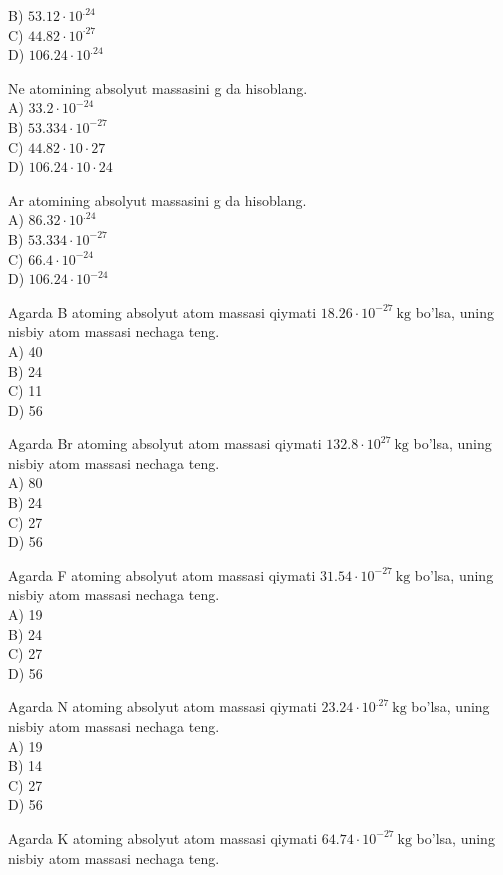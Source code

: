 B) $53.12 \cdot 10^{.24}$\\
C) $44.82 \cdot 10^{\cdot 27}$\\
D) $106.24 \cdot 10^{.24}$
  \item Ne atomining absolyut massasini g da hisoblang.\\
A) $33.2 \cdot 10^{-24}$\\
B) $53.334 \cdot 10^{-27}$\\
C) $44.82 \cdot 10 \cdot 27$\\
D) $106.24 \cdot 10 \cdot 24$
  \item Ar atomining absolyut massasini g da hisoblang.\\
A) $86.32 \cdot 10^{.24}$\\
B) $53.334 \cdot 10^{-27}$\\
C) $66.4 \cdot 10^{-24}$\\
D) $106.24 \cdot 10^{-24}$
  \item Agarda B atoming absolyut atom massasi qiymati $18.26 \cdot 10^{-27} \mathrm{~kg}$ bo'lsa, uning nisbiy atom massasi nechaga teng.\\
A) 40\\
B) 24\\
C) 11\\
D) 56\\
  \item Agarda Br atoming absolyut atom massasi qiymati $132.8 \cdot 10^{27} \mathrm{~kg}$ bo'lsa, uning nisbiy atom massasi nechaga teng.\\
A) 80\\
B) 24\\
C) 27\\
D) 56
  \item Agarda F atoming absolyut atom massasi qiymati $31.54 \cdot 10^{-27} \mathrm{~kg}$ bo'lsa, uning nisbiy atom massasi nechaga teng.\\
A) 19\\
B) 24\\
C) 27\\
D) 56
  \item Agarda N atoming absolyut atom massasi qiymati $23.24 \cdot 10^{.27} \mathrm{~kg}$ bo'lsa, uning nisbiy atom massasi nechaga teng.\\
A) 19\\
B) 14\\
C) 27\\
D) 56
  \item Agarda K atoming absolyut atom massasi qiymati $64.74 \cdot 10^{-27} \mathrm{~kg}$ bo'lsa, uning nisbiy atom massasi nechaga teng.\\
